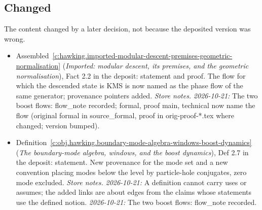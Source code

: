 \documentclass[11pt]{article}
\theoremstyle{definition}
\theoremstyle{plain}
\begin{document}
\subsection*{Changed}
The content changed by a later decision, not because the deposited version was wrong.
\begin{itemize}\setlength{\itemsep}{2pt}
\item Assembled~\ref{c:hawking.imported-modular-descent-premises-geometric-normalisation} (\emph{Imported: modular descent, its premises, and the geometric normalisation}), Fact 2.2 in the deposit: statement and proof. The flow for which the descended state is KMS is now named as the phase flow of the same generator; provenance pointers added. \emph{Store notes.} \emph{2026-10-21:} The two boost flows: flow\_note recorded; formal, proof main, technical now name the flow (original formal in source\_formal, proof in orig-proof-*.tex where changed; version bumped).
\item Definition~\ref{c:obj.hawking.boundary-mode-algebra-windows-boost-dynamics} (\emph{The boundary-mode algebra, windows, and the boost dynamics}), Def 2.7 in the deposit: statement. New provenance for the mode set and a new convention placing modes below the level by particle-hole conjugates, zero mode excluded. \emph{Store notes.} \emph{2026-10-21:} A definition cannot carry uses or assumes; the added links are about edges from the claims whose statements use the defined notion. \emph{2026-10-21:} The two boost flows: flow\_note recorded.
\end{itemize}
\end{document}
